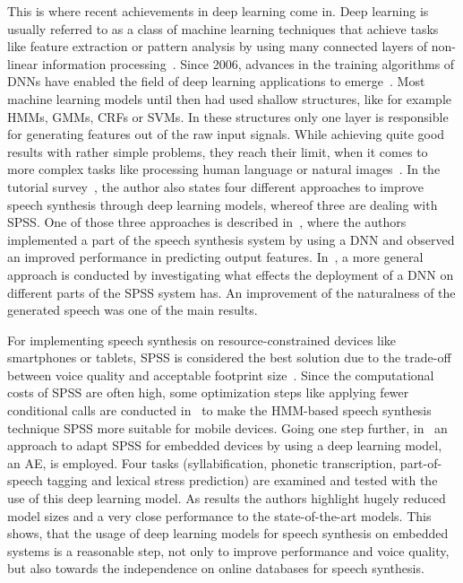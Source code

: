 This is where recent achievements in deep learning come in. Deep learning is usually referred to as a class of machine learning techniques that achieve tasks like feature extraction or pattern analysis by using many connected layers of non-linear information processing~\cite{ling:deep, li:survey}. Since 2006, advances in the training algorithms of \acp{DNN} have enabled the field of deep learning applications to emerge~\cite{boros:robust}. Most machine learning models until then had used shallow structures, like for example \acp{HMM}, \acp{GMM}, \acp{CRF} or \acp{SVM}. In these structures only one layer is responsible for generating features out of the raw input signals. While achieving quite good results with rather simple problems, they reach their limit, when it comes to more complex tasks like processing human language or natural images~\cite{li:survey}. In the tutorial survey~\cite{li:survey}, the author also states four different approaches to improve speech synthesis through deep learning models, whereof three are dealing with \ac{SPSS}. One of those three approaches is described in~\cite{zen:deepstatistical}, where the authors implemented a part of the speech synthesis system by using a \ac{DNN} and observed an improved performance in predicting output features. In~\cite{hashimoto:effect}, a more general approach is conducted by investigating what effects the deployment of a \ac{DNN} on different parts of the \ac{SPSS} system has. An improvement of the naturalness of the generated speech was one of the main results.

For implementing speech synthesis on resource-constrained devices like smartphones or tablets, \ac{SPSS} is considered the best solution due to the trade-off between voice quality and acceptable footprint size~\cite{toth:optimizing}. Since the computational costs of \ac{SPSS} are often high, some optimization steps like applying fewer conditional calls are conducted in~\cite{toth:optimizing} to make the \ac{HMM}-based speech synthesis technique \ac{SPSS} more suitable for mobile devices. Going one step further, in~\cite{boros:robust} an approach to adapt \ac{SPSS} for embedded devices by using a deep learning model, an \ac{AE}, is employed. Four tasks (syllabification, phonetic transcription, part-of-speech tagging and lexical stress prediction) are examined and tested with the use of this deep learning model. As results the authors highlight hugely reduced model sizes and a very close performance to the state-of-the-art models. This shows, that the usage of deep learning models for speech synthesis on embedded systems is a reasonable step, not only to improve performance and voice quality, but also towards the independence on online databases for speech synthesis.

